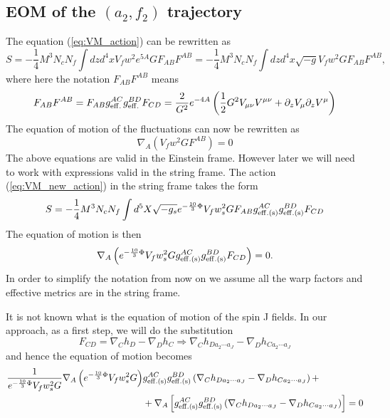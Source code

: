 \documentclass[a4paper,12pt]{article}
\begin{document}
\subsection{EOM of the $\left(a_2, f_2\right)$ trajectory}

The equation (\ref{eq:VM_action}) can be rewritten as
\begin{equation}
S = - \frac{1}{4} M^3 N_c N_f \int dz d^4 x V_f w^2 e^{5A} G F_{AB}F^{AB} = - \frac{1}{4} M^3 N_c N_f \int dz d^4 x \sqrt{-g} V_f w^2 G F_{AB}F^{AB},
\label{eq:VM_new_action}
\end{equation}
where here the notation $F_{AB}F^{AB}$ means
\begin{equation}
F_{AB}F^{AB} = F_{AB} g_{\rm{eff.}}^{AC} g_{\rm{eff.}}^{BD} F_{CD} =  \frac{2}{G^2}e^{-4A}\left( \frac{1}{2} G^2 V_{\mu \nu} V^{\mu \nu} + \partial_z V_\mu \partial_z V^\mu \right)
\end{equation}
The equation of motion of the fluctuations can now be rewritten as
\begin{equation}
\nabla_A \left(V_f w^2 G F^{AB} \right) = 0
\end{equation}
The above equations are valid in the Einstein frame. However later we will need to work with expressions valid in the string frame. The action (\ref{eq:VM_new_action}) in the string frame takes the form
\begin{equation}
S = - \frac{1}{4} M^3 N_c N_f \int d^5 X \sqrt{-g_s} e^{-\frac{10}{3} \Phi} V_f w_s^2 G F_{AB}g^{AC}_{\rm{eff. (s)}}g^{BD}_{\rm{eff. (s)}}F_{CD}
\label{eq:VM_new_action_string_frame}
\end{equation}
The equation of motion is then
\begin{equation}
\nabla_{A} \left(e^{-\frac{10}{3} \Phi} V_f w_s^2 G g^{AC}_{\rm{eff. (s)}}g^{BD}_{\rm{eff. (s)}}F_{CD}  \right) = 0.
\label{eq:U1_eom_cov_der}
\end{equation}
In order to simplify the notation from now on we assume all the warp factors and effective metrics are in the string frame.

It is not known what is the equation of motion of the spin J fields. In our approach, as a first step, we will do the substitution
\begin{equation}
F_{CD} = \nabla_C h_D - \nabla_D h_C \Rightarrow \nabla_C h_{D a_2 \cdots a_J} - \nabla_D h_{C a_2 \cdots a_J}
\label{eq:spin_j_sub}
\end{equation}
and  hence the equation of motion becomes
\begin{align}
\frac{1}{e^{-\frac{10}{3} \Phi} V_f w_s^2 G}\nabla_A \left(e^{-\frac{10}{3} \Phi} V_f w_s^2 G \right)&g^{AC}_{\rm{eff. (s)}}g^{BD}_{\rm{eff. (s)}}\left(\nabla_C h_{D a_2 \cdots a_J} - \nabla_D h_{C a_2 \cdots a_J}\right) + \notag \\
&+\nabla_A \left[g^{AC}_{\rm{eff. (s)}}g^{BD}_{\rm{eff. (s)}}\left(\nabla_C h_{D a_2 \cdots a_J} - \nabla_D h_{C a_2 \cdots a_J}\right)\right] = 0
\label{eq:spin_J_eom_cov_term}
\end{align}
\end{document}
